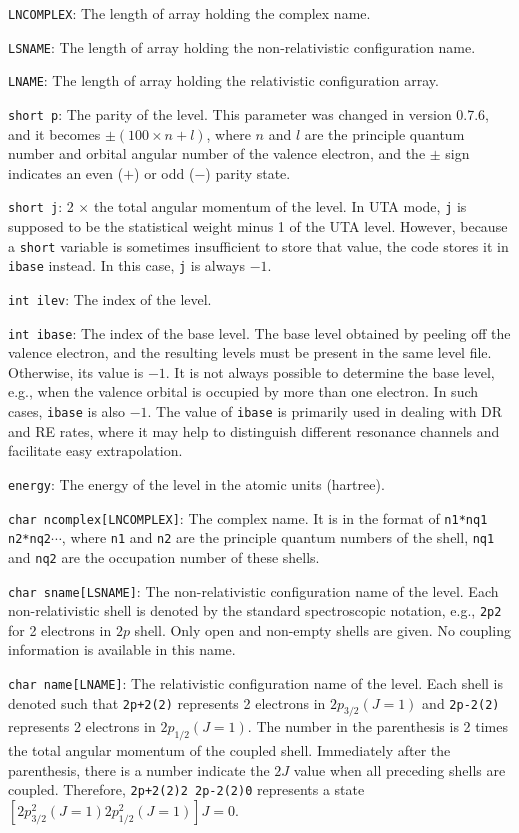 \begin{dbdesc}
\item[\texttt{LNCOMPLEX}:] The length of array holding the complex name.
\item[\texttt{LSNAME}:] The length of array holding the non-relativistic
configuration name.
\item[\texttt{LNAME}:] The length of array holding the relativistic
configuration array.
\item[\texttt{short p}:] The parity of the level. This parameter was changed
in version 0.7.6, and it becomes $\pm(100\times n + l)$, where $n$ and $l$ are
the principle quantum number and orbital angular number of the valence
electron, and the $\pm$ sign indicates an even ($+$) or odd ($-$) parity state.
\item[\texttt{short j}:] 2 $\times$ the total angular momentum of the
  level. In UTA mode, \texttt{j} is supposed to be the statistical weight
  minus 1 of the UTA level. However, because a \texttt{short} variable is
  sometimes insufficient to store that value, the code stores it in
  \texttt{ibase} instead. In this case, \texttt{j} is always $-1$.
\item[\texttt{int ilev}:] The index of the level.
\item[\texttt{int ibase}:] The index of the base level. The base level
  obtained by peeling off the valence electron, and the resulting levels must
  be present in the same level file. Otherwise, its value is $-1$. It is not
  always possible to determine the base level, e.g., when the valence orbital
  is occupied by more than one electron. In such cases, \texttt{ibase} is
  also $-1$. The value of \texttt{ibase} is primarily used in dealing with DR
  and RE rates, where it may help to distinguish different resonance channels
  and facilitate easy extrapolation.
\item[\texttt{energy}:] The energy of the level in the atomic units (hartree).
\item[\texttt{char ncomplex[LNCOMPLEX]}:] The complex name. It is in the format
of \verb|n1*nq1 n2*nq2|$\cdots$, where \verb|n1| and \verb|n2| are the
principle quantum numbers of the shell, \verb|nq1| and \verb|nq2| are the
occupation number of these shells.
\item[\texttt{char sname[LSNAME]}:] The non-relativistic configuration name of
the level. Each non-relativistic shell is denoted by the standard
spectroscopic notation, e.g., \verb|2p2| for 2 electrons in $2p$ shell. Only
open and non-empty shells are given. No coupling information is available in
this name.
\item[\texttt{char name[LNAME]}:] The relativistic configuration name of the
level. Each shell is denoted such that \verb|2p+2(2)| represents 2 electrons in
$2p_{3/2}(J=1)$ and \verb|2p-2(2)| represents 2 electrons in
$2p_{1/2}(J=1)$. The number in the parenthesis is 2 times the total angular
momentum of the coupled shell. Immediately after the parenthesis, there is a
number indicate the $2J$ value when all preceding shells are
coupled. Therefore, \verb|2p+2(2)2 2p-2(2)0| represents a state
$[2p_{3/2}^{2}(J=1) 2p_{1/2}^2(J=1)]J=0$.
\end{dbdesc}

